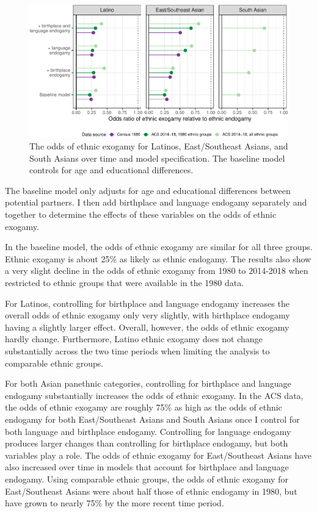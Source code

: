 \documentclass[11pt,]{article}
\begin{document}
\begin{figure}
\centering
\includegraphics{main_files/figure-latex/exog-lolly-1.pdf}
\caption{\label{fig:exog-lolly}The odds of ethnic exogamy for Latinos, East/Southeast Asians, and South Asians over time and model specification. The baseline model controls for age and educational differences.}
\end{figure}

The baseline model only adjusts for age and educational differences between potential partners. I then add birthplace and language endogamy separately and together to determine the effects of these variables on the odds of ethnic exogamy.

In the baseline model, the odds of ethnic exogamy are similar for all three groups. Ethnic exogamy is about 25\% as likely as ethnic endogamy. The results also show a very slight decline in the odds of ethnic exogamy from 1980 to 2014-2018 when restricted to ethnic groups that were available in the 1980 data.

For Latinos, controlling for birthplace and language endogamy increases the overall odds of ethnic exogamy only very slightly, with birthplace endogamy having a slightly larger effect. Overall, however, the odds of ethnic exogamy hardly change. Furthermore, Latino ethnic exogamy does not change substantially across the two time periods when limiting the analysis to comparable ethnic groups.

For both Asian panethnic categories, controlling for birthplace and language endogamy substantially increases the odds of ethnic exogamy. In the ACS data, the odds of ethnic exogamy are roughly 75\% as high as the odds of ethnic endogamy for both East/Southeast Asians and South Asians once I control for both language and birthplace endogamy. Controlling for language endogamy produces larger changes than controlling for birthplace endogamy, but both variables play a role. The odds of ethnic exogamy for East/Southeast Asians have also increased over time in models that account for birthplace and language endogamy. Using comparable ethnic groups, the odds of ethnic exogamy for East/Southeast Asians were about half those of ethnic endogamy in 1980, but have grown to nearly 75\% by the more recent time period.
\end{document}
